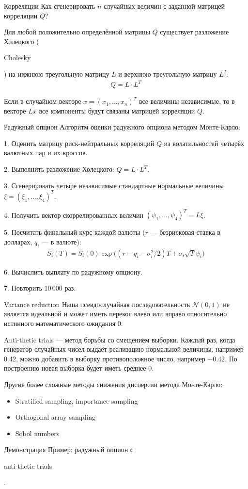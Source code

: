 \documentclass{beamer}
\newcommand{\en}[1]{\begin{otherlanguage}{english}#1\end{otherlanguage}}
\begin{document}
\begin{frame}{Корреляции}
\justify
Как сгенерировать $n$ случайных величин с заданной матрицей корреляции $Q$?

\justify
Для любой положительно определённой матрицы $Q$ существует разложение Холецкого (\en{Cholesky}) на нижнюю треугольную матрицу $L$ и верхнюю треугольную матрицу $L^T$:
\begin{align*}
Q = L \cdot L^T
\end{align*}

\justify
Если в случайном векторе $x=(x_1,...,x_n)^T$ все величины независимые, то в векторе $Lx$ все компоненты будут связаны матрицей корреляции $Q$.
\end{frame}



\begin{frame}{Радужный опцион}
\justify
Алгоритм оценки радужного опциона методом Монте-Карло:

1. Оценить матрицу риск-нейтральных корреляций $Q$ из волатильностей четырёх валютных пар и их кроссов.

2. Выполнить разложение Холецкого: $Q = L \cdot L^T$.

3. Сгенерировать четыре независимые стандартные нормальные величины $\xi = (\xi_1,...,\xi_4)^T$.

4. Получить вектор скоррелированных величин $(\psi_1,...,\psi_4)^T = L\xi$.

5. Посчитать финальный курс каждой валюты ($r$ --- безрисковая ставка в долларах, $q_i$ --- в валюте):
\begin{align*}
S_i(T) = S_i(0)\exp\Big(\left(r - q_i - \sigma_i^2/2\right)T + \sigma_i\sqrt{T}\psi_i\Big)
\end{align*}

6. Вычислить выплату по радужному опциону.

7. Повторить 10\,000 раз.
\end{frame}



\begin{frame}{Variance reduction}
\justify
Наша псевдослучайная последовательность $\mathcal{N}(0,1)$ не является идеальной и может иметь перекос влево или вправо относительно истинного математического ожидания 0.

\justify
Anti-thetic trials --- метод борьбы со смещением выборки. Каждый раз, когда генератор случайных чисел выдаёт реализацию нормальной величины, например 0.42, можно добавить в выборку противоположное число, например $-0.42$. По построению новая выборка будет иметь среднее 0.

\justify
Другие более сложные методы снижения дисперсии метода Монте-Карло:
\begin{itemize}
\item Stratified sampling, importance sampling
\item Orthogonal array sampling
\item Sobol numbers
\end{itemize}
\end{frame}



\begin{frame}{Демонстрация}
\justify
Пример: радужный опцион с \en{anti-thetic trials}.
\end{frame}
\end{document}
